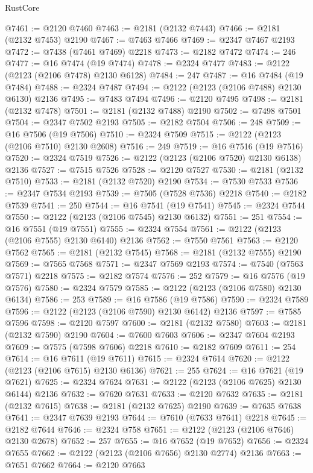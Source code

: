 \begin{lexlean}{RustCore}
\begin{coremodule}
@7461 := @2120 @7460
@7463 := @2181 (@2132 @7443)
@7466 := @2181 (@2132 @7453) @2190
@7467 := @7463 @7466
@7469 := @2347 @7467 @2193
@7472 := @7438 (@7461 @7469) @2218
@7473 := @2182 @7472
@7474 := 246
@7477 := @16 @7474 (@19 @7474)
@7478 := @2324 @7477
@7483 := @2122 (@2123 (@2106 @7478) @2130 @6128)
@7484 := 247
@7487 := @16 @7484 (@19 @7484)
@7488 := @2324 @7487
@7494 := @2122 (@2123 (@2106 @7488) @2130 @6130) @2136
@7495 := @7483 @7494
@7496 := @2120 @7495
@7498 := @2181 (@2132 @7478)
@7501 := @2181 (@2132 @7488) @2190
@7502 := @7498 @7501
@7504 := @2347 @7502 @2193
@7505 := @2182 @7504
@7506 := 248
@7509 := @16 @7506 (@19 @7506)
@7510 := @2324 @7509
@7515 := @2122 (@2123 (@2106 @7510) @2130 @2608)
@7516 := 249
@7519 := @16 @7516 (@19 @7516)
@7520 := @2324 @7519
@7526 := @2122 (@2123 (@2106 @7520) @2130 @6138) @2136
@7527 := @7515 @7526
@7528 := @2120 @7527
@7530 := @2181 (@2132 @7510)
@7533 := @2181 (@2132 @7520) @2190
@7534 := @7530 @7533
@7536 := @2347 @7534 @2193
@7539 := @7505 (@7528 @7536) @2218
@7540 := @2182 @7539
@7541 := 250
@7544 := @16 @7541 (@19 @7541)
@7545 := @2324 @7544
@7550 := @2122 (@2123 (@2106 @7545) @2130 @6132)
@7551 := 251
@7554 := @16 @7551 (@19 @7551)
@7555 := @2324 @7554
@7561 := @2122 (@2123 (@2106 @7555) @2130 @6140) @2136
@7562 := @7550 @7561
@7563 := @2120 @7562
@7565 := @2181 (@2132 @7545)
@7568 := @2181 (@2132 @7555) @2190
@7569 := @7565 @7568
@7571 := @2347 @7569 @2193
@7574 := @7540 (@7563 @7571) @2218
@7575 := @2182 @7574
@7576 := 252
@7579 := @16 @7576 (@19 @7576)
@7580 := @2324 @7579
@7585 := @2122 (@2123 (@2106 @7580) @2130 @6134)
@7586 := 253
@7589 := @16 @7586 (@19 @7586)
@7590 := @2324 @7589
@7596 := @2122 (@2123 (@2106 @7590) @2130 @6142) @2136
@7597 := @7585 @7596
@7598 := @2120 @7597
@7600 := @2181 (@2132 @7580)
@7603 := @2181 (@2132 @7590) @2190
@7604 := @7600 @7603
@7606 := @2347 @7604 @2193
@7609 := @7575 (@7598 @7606) @2218
@7610 := @2182 @7609
@7611 := 254
@7614 := @16 @7611 (@19 @7611)
@7615 := @2324 @7614
@7620 := @2122 (@2123 (@2106 @7615) @2130 @6136)
@7621 := 255
@7624 := @16 @7621 (@19 @7621)
@7625 := @2324 @7624
@7631 := @2122 (@2123 (@2106 @7625) @2130 @6144) @2136
@7632 := @7620 @7631
@7633 := @2120 @7632
@7635 := @2181 (@2132 @7615)
@7638 := @2181 (@2132 @7625) @2190
@7639 := @7635 @7638
@7641 := @2347 @7639 @2193
@7644 := @7610 (@7633 @7641) @2218
@7645 := @2182 @7644
@7646 := @2324 @758
@7651 := @2122 (@2123 (@2106 @7646) @2130 @2678)
@7652 := 257
@7655 := @16 @7652 (@19 @7652)
@7656 := @2324 @7655
@7662 := @2122 (@2123 (@2106 @7656) @2130 @2774) @2136
@7663 := @7651 @7662
@7664 := @2120 @7663

\end{coremodule}
\end{lexlean}
